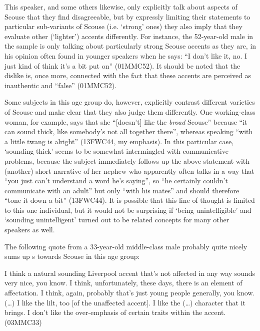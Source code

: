 This speaker, and some others likewise, only explicitly talk about aspects of Scouse that they find disagreeable, but by expressly limiting their statements to particular sub-variants of Scouse (i.e. `strong' ones) they also imply that they evaluate other (`lighter') accents differently.
For instance, the 52-year-old male in the sample is only talking about particularly strong Scouse accents as they are, in his opinion often found in younger speakers when he says: ``I don't like it, no. I just kind of think it's a bit put on'' (01MMC52).
It should be noted that the dislike is, once more, connected with the fact that these accents are perceived as inauthentic and ``false'' (01MMC52).

Some subjects in this age group do, however, explicitly contrast different varieties of Scouse and make clear that they also judge them differently.
One working-class woman, for example, says that  she ``[doesn't] like the \emph{broad} Scouse'' because ``it can sound thick, like somebody's not all together there'', whereas speaking ``with a little twang is alright'' (13FWC44, my emphasis).
In this particular case, `sounding thick' seems to be somewhat intermingled with communicative problems, because the subject immediately follows up the above statement with (another) short narrative of her nephew who apparently often talks in a way that ``you just can't understand a word he's saying'', so ``he certainly couldn't communicate with an adult'' but only ``with his mates'' and should therefore ``tone it down a bit'' (13FWC44).
It is possible that this line of thought is limited to this one individual, but it would not be surprising if `being unintelligible' and `sounding unintelligent' turned out to be related concepts for many other speakers as well.

The following quote from a 33-year-old middle-class male probably quite nicely sums up s towards Scouse in this age group:
\begin{example}
	I think a natural sounding Liverpool accent that's not affected in any way sounds very nice, you know.
	I think, unfortunately, these days, there is an element of affectation.
	I think, again, probably that's just young people generally, you know.
	(\ldots) I like the lilt, too [of the unaffected accent].
	I like the (\ldots) character that it brings.
	I don't like the over-emphasis of certain traits within the accent. (03MMC33)
\end{example}

